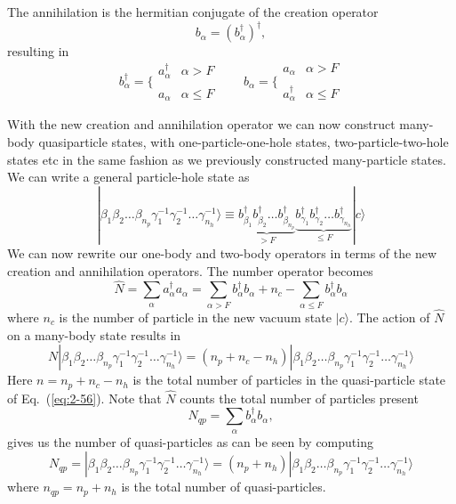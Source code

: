 The annihilation is the hermitian conjugate of the creation operator
\[
	b_\alpha = (b_\alpha^\dagger)^\dagger,
\]
resulting in
\begin{equation}
	b_\alpha^\dagger = \Bigg\{ \begin{array}{ll}
		a_\alpha^\dagger & \alpha > F \\
		\\
		a_\alpha & \alpha \leq F
	\end{array} \qquad 
	b_\alpha = \Bigg\{ \begin{array}{ll}
		a_\alpha & \alpha > F \\
		\\
		 a_\alpha^\dagger & \alpha \leq F
	\end{array} \label{eq:2-54}
\end{equation}

With the new creation and annihilation operator  we can now construct 
many-body quasiparticle states, with one-particle-one-hole states, two-particle-two-hole
states etc in the same fashion as we previously constructed many-particle states. 
We can write a general particle-hole state as
\begin{equation}
	|\beta_1\beta_2\dots \beta_{n_p} \gamma_1^{-1} \gamma_2^{-1} \dots \gamma_{n_h}^{-1}\rangle \equiv
		\underbrace{b_{\beta_1}^\dagger b_{\beta_2}^\dagger \dots b_{\beta_{n_p}}^\dagger}_{>F}
		\underbrace{b_{\gamma_1}^\dagger b_{\gamma_2}^\dagger \dots b_{\gamma_{n_h}}^\dagger}_{\leq F} |c\rangle \label{eq:2-56}
\end{equation}
We can now rewrite our one-body and two-body operators in terms of the new creation and annihilation operators.
The number operator becomes
\begin{equation}
	\hat{N} = \sum_\alpha a_\alpha^\dagger a_\alpha= 
\sum_{\alpha > F} b_\alpha^\dagger b_\alpha + n_c - \sum_{\alpha \leq F} b_\alpha^\dagger b_\alpha \label{eq:2-57b}
\end{equation}
where $n_c$ is the number of particle in the new vacuum state $|c\rangle $.  
The action of $\hat{N}$ on a many-body state results in 
\begin{equation}
	N |\beta_1\beta_2\dots \beta_{n_p} \gamma_1^{-1} \gamma_2^{-1} \dots \gamma_{n_h}^{-1}\rangle = (n_p + n_c - n_h) |\beta_1\beta_2\dots \beta_{n_p} \gamma_1^{-1} \gamma_2^{-1} \dots \gamma_{n_h}^{-1}\rangle \label{2-59}
\end{equation}
Here  $n=n_p +n_c - n_h$ is the total number of particles in the quasi-particle state of 
Eq.~(\ref{eq:2-56}). Note that  $\hat{N}$ counts the total number of particles  present 
\begin{equation}
	N_{qp} = \sum_\alpha b_\alpha^\dagger b_\alpha, \label{eq:2-60}
\end{equation}
gives us the number of quasi-particles as can be seen by computing
\begin{equation}
	N_{qp}= |\beta_1\beta_2\dots \beta_{n_p} \gamma_1^{-1} \gamma_2^{-1} \dots \gamma_{n_h}^{-1}\rangle
		= (n_p + n_h)|\beta_1\beta_2\dots \beta_{n_p} \gamma_1^{-1} \gamma_2^{-1} \dots \gamma_{n_h}^{-1}\rangle \label{eq:2-61}
\end{equation}
where $n_{qp} = n_p + n_h$ is the total number of quasi-particles.

